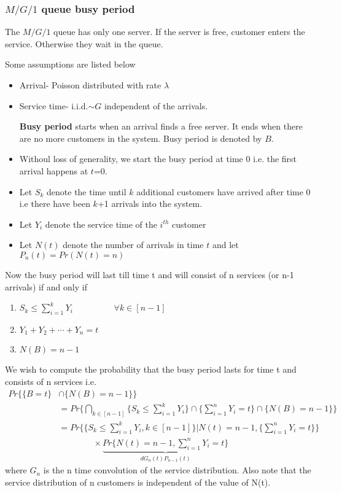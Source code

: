 \documentclass[a4paper,english,12pt]{article}
\begin{document}
\subsubsection{$M/G/1$ queue busy period}
\par The $M/G/1$ queue has only one server. If the server is free, customer enters the service. Otherwise they wait in the queue. 
\begin{assum} Some assumptions are listed below
\begin{itemize}
	\item Arrival- Poisson distributed with rate $\lambda$
	\item Service time- i.i.d.$\sim G$ independent of the arrivals.
		\begin{defn}
		\textbf{Busy period} starts when an arrival finds a free server. It ends when there are no more customers in the system. Busy period is denoted by $B$.
		\end{defn}
	\item Withoul loss of generality, we start the busy period at time 0 i.e. the first arrival happens at $t$=0.
	\item Let $S_k$ denote the time until $k$ additional customers have arrived after time 0 i.e there have been $k$+1 arrivals into the system.
	\item Let $Y_i$ denote the service time of the $i^{th}$ customer 
	\item Let $N(t)$ denote the number of arrivals in time $t$ and let $P_n(t)=Pr(N(t)=n)$
\end{itemize}
\end{assum}
\par Now the busy period will last till time t and will consist of n services (or n-1 arrivals) if and only if
\begin{enumerate}
	\item $S_k \leq \sum_{i=1}^{k}Y_i \hspace{2cm}\forall k \in [n-1]$
	\item $Y_1 + Y_2 + \cdots +Y_n=t$
	\item $N(B)=n-1$
\end{enumerate}
We wish to compute the probability that the busy period lasts for time t and consists of n services i.e.
\begin{align}
Pr\Big\{\{B=t\}  &\cap \{N(B)=n-1\}\Big\} \nonumber\\ 
& = Pr\Bigg\{\bigcap_{k \in [n-1]}\{S_k \leq \sum_{i=1}^{k}Y_i\} \cap \{\sum_{i=1}^{n}Y_i=t\} \cap \{N(B)=n-1\}\Bigg\}\nonumber \\
& = Pr\Bigg\{\{S_k \leq \sum_{i=1}^{k}Y_i , k\in [n-1]\} \Big| N(t)=n-1, \{\sum_{i=1}^{n}Y_i=t\}\Bigg\} \nonumber\\
	&\qquad \qquad \times \underbrace{Pr\Bigg\{N(t)=n-1, \sum_{i=1}^{n}Y_i=t\Bigg\}}_{dG_n(t) P_{n-1}(t)}
\end{align}
where $G_n$ is the n time convolution of the service distribution. Also note that the service distribution of n customers is independent of the value of N(t).
\end{document}
